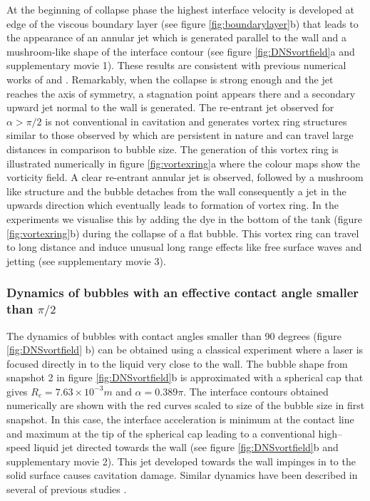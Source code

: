 \documentclass[final]{jfm}
\begin{document}
At the beginning of collapse phase the highest interface velocity is developed at edge of the viscous boundary layer (see figure \ref{fig:boundarylayer}b) that leads to the appearance of an annular jet which is generated parallel to the wall and a mushroom-like shape of the interface contour (see figure \ref{fig:DNSvortfield}a and supplementary movie 1). These results are consistent with previous numerical works of \citet{lauer2012numerical} and \citet{koukouvinis2016compressible}. Remarkably, when the collapse is strong enough and the jet reaches the axis of symmetry, a stagnation point appears there and a secondary upward jet normal to the wall is generated.
The re-entrant jet observed for $\alpha > \pi/2$ is not conventional in cavitation and generates vortex ring structures similar to those observed by \citet{reuter2017} which are persistent in nature and can travel large distances in comparison to bubble size. The generation of this vortex ring is illustrated numerically in figure \ref{fig:vortexring}a where the colour maps show the vorticity field. A clear re-entrant annular jet is observed, followed by a mushroom like structure and the bubble detaches from the wall consequently a jet in the upwards direction which eventually leads to formation of vortex ring. In the experiments we visualise this by adding the dye in the bottom of the tank (figure \ref{fig:vortexring}b) during the collapse of a flat bubble. This vortex ring can travel to long distance and induce unusual long range effects like free surface waves and jetting (see supplementary movie 3).
\\

\subsubsection{Dynamics of bubbles with an effective contact angle smaller than $\pi/2$}

The dynamics of bubbles with contact angles smaller than 90 degrees (figure \ref{fig:DNSvortfield} b) can be obtained using a classical experiment where a laser is focused directly in to the liquid very close to the wall. The bubble shape from snapshot 2 in figure \ref{fig:DNSvortfield}b is approximated with a spherical cap that gives 
$R_c = 7.63\times 10^{-3} m$ and $\alpha = 0.389 \pi$. The interface contours obtained numerically are shown with the red curves scaled to size of the bubble size in first snapshot. In this case, the interface acceleration is minimum at the contact line and maximum at the tip of the spherical cap leading to a conventional high--speed liquid jet directed towards the wall (see figure \ref{fig:DNSvortfield}b and supplementary movie 2). This jet developed towards the wall impinges in to the solid surface causes cavitation damage. Similar dynamics have been described in several of previous studies \citep{naude1961mechanism,gonzalez2021}.
\end{document}
